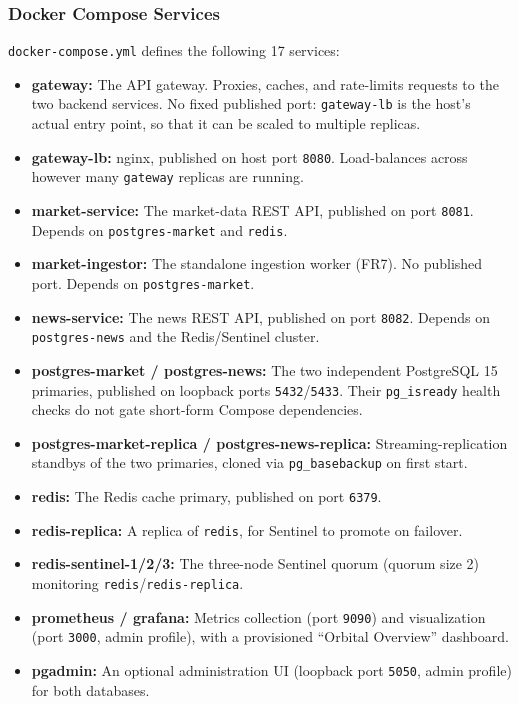 \documentclass{scrartcl}
\begin{document}
\subsubsection{Docker Compose Services}\label{deployment-services}

\texttt{docker-compose.yml} defines the following 17 services:

\begin{itemize}
  \item \textbf{gateway:} The API gateway. Proxies, caches, and rate-limits requests to the two
  backend services. No fixed published port: \texttt{gateway-lb} is the host's actual entry
  point, so that it can be scaled to multiple replicas.
  \item \textbf{gateway-lb:} nginx, published on host port \texttt{8080}. Load-balances across
  however many \texttt{gateway} replicas are running.
  \item \textbf{market-service:} The market-data REST API, published on port \texttt{8081}.
  Depends on \texttt{postgres-market} and \texttt{redis}.
  \item \textbf{market-ingestor:} The standalone ingestion worker (FR7). No published port.
  Depends on \texttt{postgres-market}.
  \item \textbf{news-service:} The news REST API, published on port \texttt{8082}. Depends on
  \texttt{postgres-news} and the Redis/Sentinel cluster.
  \item \textbf{postgres-market / postgres-news:} The two independent PostgreSQL 15 primaries,
  published on loopback ports \texttt{5432}/\texttt{5433}. Their \texttt{pg\_isready} health
  checks do not gate short-form Compose dependencies.
  \item \textbf{postgres-market-replica / postgres-news-replica:} Streaming-replication standbys
  of the two primaries, cloned via \texttt{pg\_basebackup} on first start.
  \item \textbf{redis:} The Redis cache primary, published on port \texttt{6379}.
  \item \textbf{redis-replica:} A replica of \texttt{redis}, for Sentinel to promote on failover.
  \item \textbf{redis-sentinel-1/2/3:} The three-node Sentinel quorum (quorum size 2) monitoring
  \texttt{redis}/\texttt{redis-replica}.
  \item \textbf{prometheus / grafana:} Metrics collection (port \texttt{9090}) and visualization
  (port \texttt{3000}, admin profile), with a provisioned ``Orbital Overview'' dashboard.
  \item \textbf{pgadmin:} An optional administration UI (loopback port \texttt{5050}, admin
  profile) for both databases.
\end{itemize}
\end{document}
